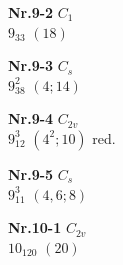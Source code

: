 \documentclass[12pt]{article}
\begin{document}
{\begin{minipage}[t]{3.5cm}
\par
{{\bf Nr.9-2} \quad $C_{1}$\\ $9_{33}$ \quad $(18)$\\\vspace{3mm} }
\end{minipage}
\setlength{\unitlength}{1cm}
\begin{minipage}[t]{3.5cm}
\centering
\epsfxsize=2.5cm
\par
{{\bf Nr.9-3} \quad $C_{s}$\\ $9^2_{38}$ \quad $(4;14)$\\\vspace{3mm} }
\end{minipage}
\setlength{\unitlength}{1cm}
\begin{minipage}[t]{3.5cm}
\centering
\epsfxsize=2.5cm
\par
{{\bf Nr.9-4} \quad $C_{2v}$\\ $9^3_{12}$ \quad $(4^2;10)$ red.\\\vspace{3mm} }
\end{minipage}
\setlength{\unitlength}{1cm}
\begin{minipage}[t]{3.5cm}
\centering
\epsfxsize=2.5cm
\par
{{\bf Nr.9-5} \quad $C_{s}$\\ $9^3_{11}$ \quad $(4,6;8)$\\\vspace{3mm} }
\end{minipage}
\setlength{\unitlength}{1cm}
\begin{minipage}[t]{3.5cm}
\centering
\epsfxsize=2.5cm
\par
{{\bf Nr.10-1} \quad $C_{2v}$\\ $10_{120}$ \quad $(20)$\\\vspace{3mm} }

\end{minipage}}
\end{document}

